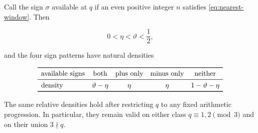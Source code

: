 \begin{theorem}
\label{thm:candidate-density}
Call the sign $\sigma$ available at $q$ if an even positive integer $n$
satisfies \cref{eq:nearest-window}. Then

\begin{equation}
 0<\eta<\vartheta<\frac12,
 \label{eq:phase-order}
\end{equation}

and the four sign patterns have natural densities

\begin{equation}
\begin{array}{lcccc}
 \toprule
 \text{available signs}&\text{both}&\text{plus only}&\text{minus only}&\text{neither}\\
 \midrule
 \text{density}&\vartheta-\eta&\eta&\eta&1-\vartheta-\eta\\
 \bottomrule
\end{array}
\label{eq:window-densities}
\end{equation}

The same relative densities hold after restricting $q$ to any fixed
arithmetic progression. In particular, they remain valid on either class
$q\equiv1,2\pmod3$ and on their union $3\nmid q$.
\end{theorem}

